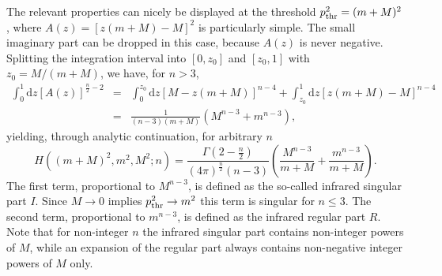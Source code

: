 \documentclass[twoside,12pt]{article}
\begin{document}
   The relevant properties can nicely be displayed at the threshold
$p^2_{\rm thr}=(m+M)^2$, where $A(z)=[z(m+M)-M]^2$
is particularly simple.
   The small imaginary part can be dropped in this case, because $A(z)$
is never negative.
    Splitting the integration interval into $[0,z_0]$ and $[z_0,1]$ with
$z_0=M/(m+M)$, we have, for $n>3$,
\begin{eqnarray*}
\int_0^1 \mbox{d}z [A(z)]^{\frac{n}{2}-2}&=&\int_0^{z_0}\mbox{d}z [M-z(m+M)]^{n-4}
+\int_{z_0}^1\mbox{d}z [z(m+M)-M]^{n-4}\\
&=&\frac{1}{(n-3)(m+M)}(M^{n-3}+m^{n-3}),
\end{eqnarray*}
yielding, through analytic continuation, for arbitrary $n$
\begin{equation}
\label{4:3:2:defhthr}
 H((m+M)^2,m^2,M^2;n)=
\frac{\Gamma\left(2-\frac{n}{2}\right)}{(4\pi)^{\frac{n}{2}}(n-3)}
\left(\frac{M^{n-3}}{m+M}+\frac{m^{n-3}}{m+M}\right).
\end{equation}
   The first term, proportional to $M^{n-3}$, is defined as the so-called
infrared singular part $I$.
   Since $M\to 0$ implies $p^2_{\rm thr} \to m^2$ this term is
singular for $n\leq 3$.
   The second term, proportional to $m^{n-3}$, is defined as the
infrared regular part $R$.
   Note that for non-integer $n$ the infrared singular
part contains non-integer powers of $M$, while an
expansion of the regular part always contains non-negative integer powers
of $M$ only.
\end{document}
